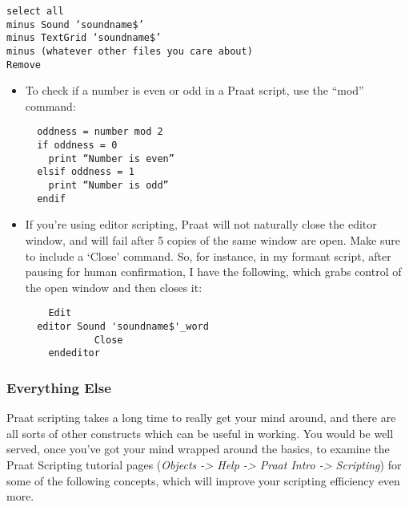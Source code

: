\documentclass[11pt]{article}
\def\tightlist{}
\begin{document}
\begin{verbatim} 
select all
minus Sound ‘soundname$’
minus TextGrid ‘soundname$’
minus (whatever other files you care about)
Remove
\end{verbatim}

\begin{itemize}
\tightlist
\item
  To check if a number is even or odd in a Praat script, use the ``mod''
  command:

  \begin{verbatim}
  oddness = number mod 2
  if oddness = 0
    print “Number is even”
  elsif oddness = 1
    print “Number is odd”
  endif
  \end{verbatim}
\item
  If you're using editor scripting, Praat will not naturally close the
  editor window, and will fail after 5 copies of the same window are
  open. Make sure to include a `Close' command. So, for instance, in my
  formant script, after pausing for human confirmation, I have the
  following, which grabs control of the open window and then closes
  it:\\

  \begin{verbatim}
    Edit
  editor Sound 'soundname$'_word
            Close
    endeditor
  \end{verbatim}
\end{itemize}

\hypertarget{everything-else}{%
\subsubsection{Everything Else}\label{everything-else}}

Praat scripting takes a long time to really get your mind around, and
there are all sorts of other constructs which can be useful in working.
You would be well served, once you've got your mind wrapped around the
basics, to examine the Praat Scripting tutorial pages (\emph{Objects
-\textgreater{} Help -\textgreater{} Praat Intro -\textgreater{}
Scripting}) for some of the following concepts, which will improve your
scripting efficiency even more.
\end{document}
